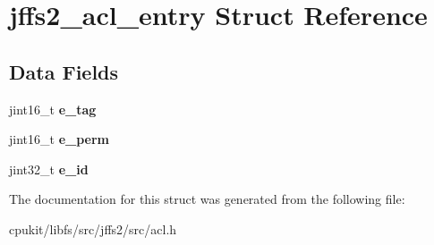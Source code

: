 \hypertarget{structjffs2__acl__entry}{}\section{jffs2\+\_\+acl\+\_\+entry Struct Reference}
\label{structjffs2__acl__entry}
\subsection*{Data Fields}
\begin{DoxyCompactItemize}
\item 
\mbox{\label{structjffs2__acl__entry_a1d4c248e1742d618ac5b3a648d19560b}} 
jint16\+\_\+t {\bfseries e\+\_\+tag}
\item 
\mbox{\label{structjffs2__acl__entry_af8d3fc3b6d8ce65cf8f66d51bab54229}} 
jint16\+\_\+t {\bfseries e\+\_\+perm}
\item 
\mbox{\label{structjffs2__acl__entry_a33a4870377879b3d1aada8df44c8937e}} 
jint32\+\_\+t {\bfseries e\+\_\+id}
\end{DoxyCompactItemize}


The documentation for this struct was generated from the following file\+:\begin{DoxyCompactItemize}
\item 
cpukit/libfs/src/jffs2/src/acl.\+h\end{DoxyCompactItemize}
